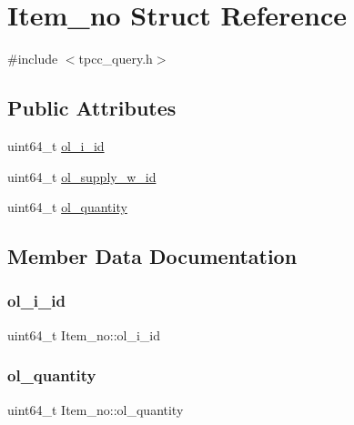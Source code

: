 \hypertarget{structItem__no}{}\section{Item\+\_\+no Struct Reference}
\label{structItem__no}


{\ttfamily \#include $<$tpcc\+\_\+query.\+h$>$}

\subsection*{Public Attributes}
\begin{DoxyCompactItemize}
\item 
uint64\+\_\+t \hyperlink{structItem__no_a7e8e7c471a29aa86061aca5b74e0c649}{ol\+\_\+i\+\_\+id}
\item 
uint64\+\_\+t \hyperlink{structItem__no_a5591ec2280225b1bf0397ebdf37510cc}{ol\+\_\+supply\+\_\+w\+\_\+id}
\item 
uint64\+\_\+t \hyperlink{structItem__no_a340cb7af9c65b00f059b137493df4c5d}{ol\+\_\+quantity}
\end{DoxyCompactItemize}


\subsection{Member Data Documentation}
\mbox{\label{structItem__no_a7e8e7c471a29aa86061aca5b74e0c649}} 
\subsubsection{\texorpdfstring{ol\+\_\+i\+\_\+id}{ol\_i\_id}}
{\footnotesize\ttfamily uint64\+\_\+t Item\+\_\+no\+::ol\+\_\+i\+\_\+id}

\mbox{\label{structItem__no_a340cb7af9c65b00f059b137493df4c5d}} 
\subsubsection{\texorpdfstring{ol\+\_\+quantity}{ol\_quantity}}
{\footnotesize\ttfamily uint64\+\_\+t Item\+\_\+no\+::ol\+\_\+quantity}

